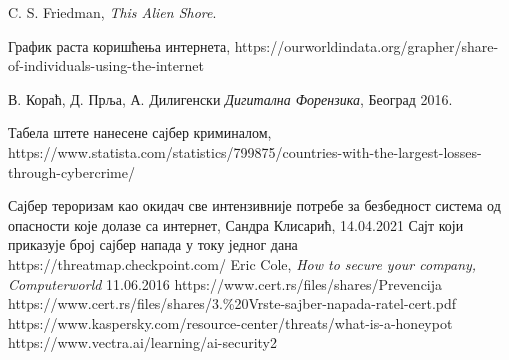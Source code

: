 \documentclass[a4paper]{article}
\begin{document}
\newpage
    \appendix

     
    

    \begin{thebibliography}{9}

    C. S. Friedman, \emph{This Alien Shore}.

    График раста коришћења интернета, https://ourworldindata.org/grapher/share-of-individuals-using-the-internet

    В. Кораћ, Д. Прља, А. Дилигенски \emph{Дигитална Форензика}, Београд 2016.

    Табела штете нанесене сајбер криминалом, https://www.statista.com/statistics/799875/countries-with-the-largest-losses-through-cybercrime/
    
    Сајбер тероризам као окидач све интензивније потребе за безбедност система од опасности које долазе са интернет, Сандра Клисарић, 14.04.2021
	 Сајт који приказује број сајбер напада у току једног дана https://threatmap.checkpoint.com/
	Eric Cole, \emph{How to secure your company, Computerworld} 11.06.2016 
	https://www.cert.rs/files/shares/Prevencija%
	https://www.cert.rs/files/shares/3.\%20Vrste-sajber-napada-ratel-cert.pdf
	https://www.kaspersky.com/resource-center/threats/what-is-a-honeypot
	 https://www.vectra.ai/learning/ai-security2
    \end{thebibliography}
	
    \appendix
\end{document}
